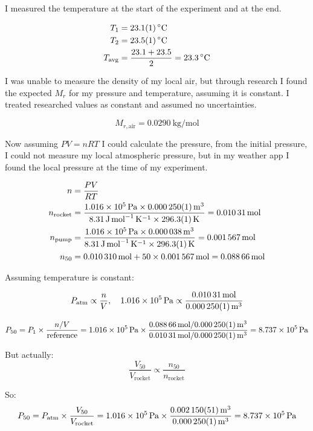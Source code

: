 \documentclass[12pt,a4paper]{article}
\begin{document}
I measured the temperature at the start of the experiment and at the end.

\begin{align}
T_1 &= \SI{23.1 \pm 0.1}{\celsius}\\
T_2 &= \SI{23.5 \pm 0.1}{\celsius}\\
T_{\text{avg}} &= \frac{23.1 + 23.5}{2} = \SI{23.3}{\celsius}
\end{align}

I was unable to measure the density of my local air, but through research I found the expected $M_r$ for my pressure and temperature, assuming it is constant. I treated researched values as constant and assumed no uncertainties.

$$M_{r,\text{air}} = \SI{0.0290}{\kilogram\per\mole}$$

Now assuming $PV = nRT$ I could calculate the pressure, from the initial pressure, I could not measure my local atmospheric pressure, but in my weather app I found the local pressure at the time of my experiment.

\begin{align}
n &= \frac{PV}{RT}\\
n_{\text{rocket}} &= \frac{\SI{1.016e5}{\pascal} \times \SI{0.000250 \pm 0.000001}{\meter\cubed}}{\SI{8.31}{\joule\per\mole\per\kelvin} \times \SI{296.3 \pm 0.1}{\kelvin}} = \SI{0.01031}{\mole}\\
n_{\text{pump}} &= \frac{\SI{1.016e5}{\pascal} \times \SI{0.000038}{\meter\cubed}}{\SI{8.31}{\joule\per\mole\per\kelvin} \times \SI{296.3 \pm 0.1}{\kelvin}} = \SI{0.001567}{\mole}\\
n_{50} &= \SI{0.010310}{\mole} + 50 \times \SI{0.001567}{\mole} = \SI{0.08866}{\mole}
\end{align}

Assuming temperature is constant:

$$P_{\text{atm}} \propto \frac{n}{V}, \quad \SI{1.016e5}{\pascal} \propto \frac{\SI{0.01031}{\mole}}{\SI{0.000250 \pm 0.000001}{\meter\cubed}}$$

$$P_{50} = P_1 \times \frac{n/V}{\text{reference}} = \SI{1.016e5}{\pascal} \times \frac{\SI{0.08866}{\mole} / \SI{0.000250 \pm 0.000001}{\meter\cubed}}{\SI{0.01031}{\mole} / \SI{0.000250 \pm 0.000001}{\meter\cubed}} = \SI{8.737e5}{\pascal}$$

But actually:
$$\frac{V_{50}}{V_{\text{rocket}}} \propto \frac{n_{50}}{n_{\text{rocket}}}$$

So:
$$P_{50} = P_{\text{atm}} \times \frac{V_{50}}{V_{\text{rocket}}} = \SI{1.016e5}{\pascal} \times \frac{\SI{0.002150 \pm 0.000051}{\meter\cubed}}{\SI{0.000250 \pm 0.000001}{\meter\cubed}} = \SI{8.737e5}{\pascal}$$
\end{document}
